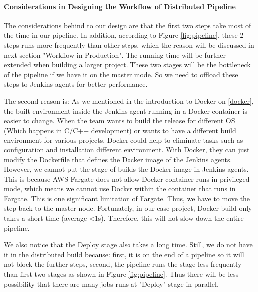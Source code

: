 \paragraph[]{Considerations in Designing the Workflow of Distributed Pipeline}
The considerations behind to our design are that the first two steps take most of the time in our pipeline. In addition, according to Figure \ref{fig:pipeline}, these 2 steps runs more frequently than other steps, which the reason will be discussed in next section "Workflow in Production". The running time will be further extended when building a larger project. These two stages will be the bottleneck of the pipeline if we have it on the master mode. So we need to offload these steps to Jenkins agents for better performance.
\par
The second reason is: As we mentioned in the introduction to Docker on \ref {docker}, the built environment inside the Jenkins agent running in a Docker container is easier to change.
When the team wants to build the release for different OS (Which happens in C/C++ development) or wants to have a different build environment for various projects, Docker could help to eliminate tasks such as configuration and installation different environment. With Docker, they can just modify the Dockerfile that defines the Docker image of the Jenkins agents. 
However, we cannot put the stage of builds the Docker image in Jenkins agents. This is because AWS Fargate does not allow Docker container runs in privileged mode, which means we cannot use Docker within the container that runs in Fargate. This is one significant limitation of Fargate. Thus, we have to move the step back to the master node. Fortunately, in our case project, Docker build only takes a short time (average <1s). Therefore, this will not slow down the entire pipeline.
\par
We also notice that the Deploy stage also takes a long time. Still, we do not have it in the distributed build because: first, it is on the end of a pipeline so it will not block the further steps, second, the pipeline runs the stage less frequently than first two stages as shown in Figure \ref{fig:pipeline}. Thus there will be less possibility that there are many jobs runs at "Deploy" stage in parallel.
